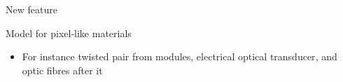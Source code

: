 \documentclass[pdftex, 11pt]{beamer}
\begin{document}
\begin{frame}{New feature}
  \begin{block}{Model for \alert{pixel-like} materials}
    \begin{itemize}
    \item For instance \alert{twisted pair} from modules, electrical optical \alert{transducer}, and \alert{optic fibres} after it
    \end{itemize}
  \end{block}
  \begin{center}
  \end{center}
\end{frame}
\end{document}
